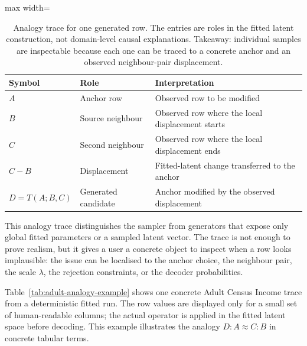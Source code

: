 \begin{table}[t]
\centering
\caption{Analogy trace for one generated row. The entries are roles in the
fitted latent construction, not domain-level causal explanations. Takeaway:
individual samples are inspectable because each one can be traced to a concrete
anchor and an observed neighbour-pair displacement.}
\label{tab:analogy-trace}
\small
\begin{adjustbox}{max width=\textwidth}
\begin{tabular}{@{}lll@{}}
\toprule
Symbol & Role & Interpretation \\
\midrule
$A$ & Anchor row & Observed row to be modified \\
$B$ & Source neighbour & Observed row where the local displacement starts \\
$C$ & Second neighbour & Observed row where the local displacement ends \\
$C-B$ & Displacement & Fitted-latent change transferred to the anchor \\
$D=T(A;B,C)$ & Generated candidate & Anchor modified by the observed displacement \\
\bottomrule
\end{tabular}
\end{adjustbox}
\end{table}

This analogy trace distinguishes the sampler from generators that expose only
global fitted parameters or a sampled latent vector. The trace is not enough to
prove realism, but it gives a user a concrete object to inspect when a row looks
implausible: the issue can be localised to the anchor choice, the neighbour
pair, the scale $\lambda$, the rejection constraints, or the decoder
probabilities.

Table~\ref{tab:adult-analogy-example} shows one concrete Adult Census Income
trace from a deterministic fitted run. The row values are displayed only for a
small set of human-readable columns; the actual operator is applied in the
fitted latent space before decoding. This example illustrates the analogy
$D : A \approx C : B$ in concrete tabular terms.

